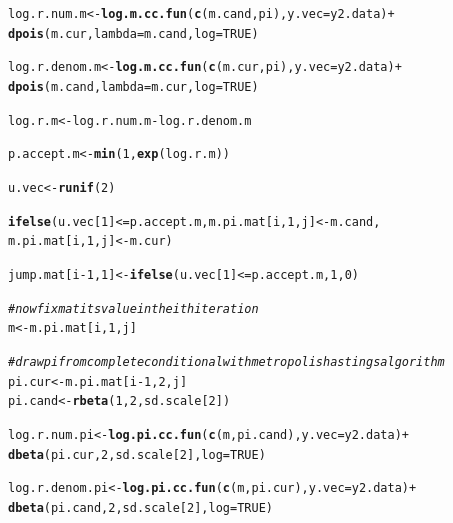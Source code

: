 \documentclass[12pt]{article}\usepackage[]{graphicx}\usepackage[]{color}
\makeatletter
\newcommand{\hlnum}[1]{\textcolor[rgb]{0.686,0.059,0.569}{#1}}%
\newcommand{\hlcom}[1]{\textcolor[rgb]{0.678,0.584,0.686}{\textit{#1}}}%
\newcommand{\hlopt}[1]{\textcolor[rgb]{0,0,0}{#1}}%
\newcommand{\hlstd}[1]{\textcolor[rgb]{0.345,0.345,0.345}{#1}}%
\newcommand{\hlkwb}[1]{\textcolor[rgb]{0.69,0.353,0.396}{#1}}%
\newcommand{\hlkwc}[1]{\textcolor[rgb]{0.333,0.667,0.333}{#1}}%
\newcommand{\hlkwd}[1]{\textcolor[rgb]{0.737,0.353,0.396}{\textbf{#1}}}%
\newenvironment{kframe}{%
 \def\at@end@of@kframe{}%
 \ifinner\ifhmode%
  \def\at@end@of@kframe{\end{minipage}}%
  \begin{minipage}{\columnwidth}%
 \fi\fi%
 \def\FrameCommand##1{\hskip\@totalleftmargin \hskip-\fboxsep
 \colorbox{shadecolor}{##1}\hskip-\fboxsep
     \hskip-\linewidth \hskip-\@totalleftmargin \hskip\columnwidth}%
 \MakeFramed {\advance\hsize-\width
   \@totalleftmargin\z@ \linewidth\hsize
   \@setminipage}}%
 {\par\unskip\endMakeFramed%
 \at@end@of@kframe}
\newenvironment{knitrout}{}{} %
\makeatother
\begin{document}
\begin{enumerate}
\begin{enumerate}
\begin{enumerate}
\begin{knitrout}
\begin{kframe}
\begin{alltt}
    \hlstd{log.r.num.m} \hlkwb{<-} \hlkwd{log.m.cc.fun}\hlstd{(}\hlkwd{c}\hlstd{(m.cand, pi),} \hlkwc{y.vec} \hlstd{= y2.data)} \hlopt{+}
                     \hlkwd{dpois}\hlstd{(m.cur,} \hlkwc{lambda}\hlstd{=m.cand,} \hlkwc{log} \hlstd{=} \hlnum{TRUE}\hlstd{)}

    \hlstd{log.r.denom.m} \hlkwb{<-} \hlkwd{log.m.cc.fun}\hlstd{(}\hlkwd{c}\hlstd{(m.cur, pi),} \hlkwc{y.vec} \hlstd{= y2.data)} \hlopt{+}
                       \hlkwd{dpois}\hlstd{(m.cand,} \hlkwc{lambda}\hlstd{=m.cur,} \hlkwc{log} \hlstd{=} \hlnum{TRUE}\hlstd{)}

    \hlstd{log.r.m} \hlkwb{<-} \hlstd{log.r.num.m} \hlopt{-} \hlstd{log.r.denom.m}

    \hlstd{p.accept.m} \hlkwb{<-} \hlkwd{min}\hlstd{(}\hlnum{1}\hlstd{,} \hlkwd{exp}\hlstd{(log.r.m))}

    \hlstd{u.vec} \hlkwb{<-} \hlkwd{runif}\hlstd{(}\hlnum{2}\hlstd{)}

    \hlkwd{ifelse}\hlstd{(u.vec[}\hlnum{1}\hlstd{]} \hlopt{<=} \hlstd{p.accept.m, m.pi.mat[i,} \hlnum{1}\hlstd{, j]} \hlkwb{<-} \hlstd{m.cand,}
           \hlstd{m.pi.mat[i,} \hlnum{1}\hlstd{, j]} \hlkwb{<-} \hlstd{m.cur)}

    \hlstd{jump.mat[i}\hlopt{-}\hlnum{1}\hlstd{,} \hlnum{1}\hlstd{]} \hlkwb{<-} \hlkwd{ifelse}\hlstd{(u.vec[}\hlnum{1}\hlstd{]} \hlopt{<=} \hlstd{p.accept.m,} \hlnum{1}\hlstd{,} \hlnum{0}\hlstd{)}

    \hlcom{#now fix m at its value in the ith iteration}
    \hlstd{m} \hlkwb{<-} \hlstd{m.pi.mat[i,} \hlnum{1}\hlstd{, j]}

    \hlcom{#draw pi from complete conditional with metropolis hastings algorithm}
    \hlstd{pi.cur} \hlkwb{<-} \hlstd{m.pi.mat[i}\hlopt{-}\hlnum{1}\hlstd{,} \hlnum{2}\hlstd{, j]}
    \hlstd{pi.cand} \hlkwb{<-} \hlkwd{rbeta}\hlstd{(}\hlnum{1}\hlstd{,} \hlnum{2}\hlstd{, sd.scale[}\hlnum{2}\hlstd{])}

    \hlstd{log.r.num.pi} \hlkwb{<-} \hlkwd{log.pi.cc.fun}\hlstd{(}\hlkwd{c}\hlstd{(m, pi.cand),} \hlkwc{y.vec} \hlstd{= y2.data)} \hlopt{+}
                     \hlkwd{dbeta}\hlstd{(pi.cur,} \hlnum{2}\hlstd{, sd.scale[}\hlnum{2}\hlstd{],} \hlkwc{log} \hlstd{=} \hlnum{TRUE}\hlstd{)}

    \hlstd{log.r.denom.pi} \hlkwb{<-} \hlkwd{log.pi.cc.fun}\hlstd{(}\hlkwd{c}\hlstd{(m, pi.cur),} \hlkwc{y.vec} \hlstd{= y2.data)} \hlopt{+}
                       \hlkwd{dbeta}\hlstd{(pi.cand,} \hlnum{2}\hlstd{, sd.scale[}\hlnum{2}\hlstd{],} \hlkwc{log} \hlstd{=} \hlnum{TRUE}\hlstd{)}


\end{alltt}
\end{kframe}
\end{knitrout}
\end{enumerate}
\end{enumerate}
\end{enumerate}
\end{document}
